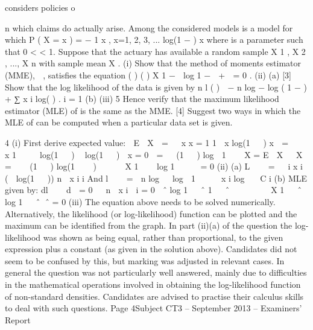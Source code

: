 considers policies o\documentclass[a4paper,12pt]{article}
\begin{document}
n which claims do actually arise. Among the considered models is
a model for which
P ( X = x ) = −
1
\theta  x
, x=1, 2, 3, ...
log(1 − \theta  ) x
where \theta  is a parameter such that 0 < \theta  < 1.
Suppose that the actuary has available a random sample X 1 , X 2 , ..., X n with sample
mean X .
(i)
Show that the method of moments estimator (MME),  \theta  , satisfies the equation
(
) (
)
X 1 −  \theta  log 1 −  \theta  +  \theta  = 0 .
(ii)
(a)
[3]
Show that the log likelihood of the data is given by
n
l ( \theta  ) ∝ − n log { − log ( 1 − \theta  ) } + ∑ x i log( \theta  ) .
i = 1
(b)
(iii)
5
Hence verify that the maximum likelihood estimator (MLE) of \theta  is the
same as the MME.
[4]
Suggest two ways in which the MLE of \theta  can be computed when a particular
data set is given.


4
(i)
First derive expected value:

E  X  =   x
x  =  1
1
 x
log(1   ) x

=


 x
1

   log(1   )  \theta  log(1   )

x  =  0 
= 

(1   ) log  1   
X  =  E  X   X  =  
 
(1   ) log(1    )

 

 X 1  
 log 1   \theta     =  0
(ii)
(a)
L     = 
  i
x i
(  log(1   )) n  x i
i
And l     =   n log   log  1    \theta   x i log   \theta  C
i
(b)
MLE given by:
dl   
d 
= 0 

n
 x i
 i = 0
 ˆ
log 1   ˆ 1   ˆ

 



 X 1   ˆ log 1   ˆ\theta   ˆ  =  0
(iii)
The equation above needs to be solved numerically. Alternatively, the
likelihood (or log-likelihood) function can be plotted and the maximum can be
identified from the graph.
In part (ii)(a) of the question the log-likelihood was shown as being equal, rather than
proportional, to the given expression plus a constant (as given in the solution above).
Candidates did not seem to be confused by this, but marking was adjusted in relevant cases.
In general the question was not particularly well answered, mainly due to difficulties in the
mathematical operations involved in obtaining the log-likelihood function of non-standard
densities. Candidates are advised to practise their calculus skills to deal with such questions.
Page 4Subject CT3 – September 2013 – Examiners’ Report
\end{document}
